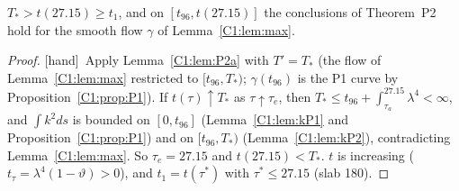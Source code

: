 \documentclass[11pt]{article}
\newcommand{\tH}{\textup{[hand]}}\newcommand{\tS}{\textup{[sym]}}\newcommand{\tC}{\textup{[cert]}}\newcommand{\tI}{\textup{[cited]}}\newcommand{\tN}{\textup{[num]}}\newcommand{\tL}{\textup{[Lean]}}
\begin{document}
\begin{proposition}[identification on P2]\label{C1:prop:P2}
$T_*>t(27.15)\ge t_1$, and on $[t_{96},t(27.15)]$ the conclusions of Theorem~P2 hold for the smooth flow $\gamma$ of Lemma~\ref{C1:lem:max}.
\end{proposition}
\begin{proof}\tH\ Apply Lemma~\ref{C1:lem:P2a} with $T'=T_*$ (the flow of Lemma~\ref{C1:lem:max} restricted to $[t_{96},T_*)$; $\gamma(t_{96})$ is the P1 curve by Proposition~\ref{C1:prop:P1}). If $t(\tau)\uparrow T_*$ as $\tau\uparrow\tau_e$, then $T_*\le t_{96}+\int_{\tau_a}^{27.15}\lambda^4<\infty$, and $\int k^2ds$ is bounded on $[0,t_{96}]$ (Lemma~\ref{C1:lem:kP1} and Proposition~\ref{C1:prop:P1}) and on $[t_{96},T_*)$ (Lemma~\ref{C1:lem:kP2}), contradicting Lemma~\ref{C1:lem:max}. So $\tau_e=27.15$ and $t(27.15)<T_*$. $t$ is increasing ($t_\tau=\lambda^4(1-\vartheta)>0$), and $t_1=t(\tau^*)$ with $\tau^*\le27.15$ (slab 180).
\end{proof}

\end{document}
